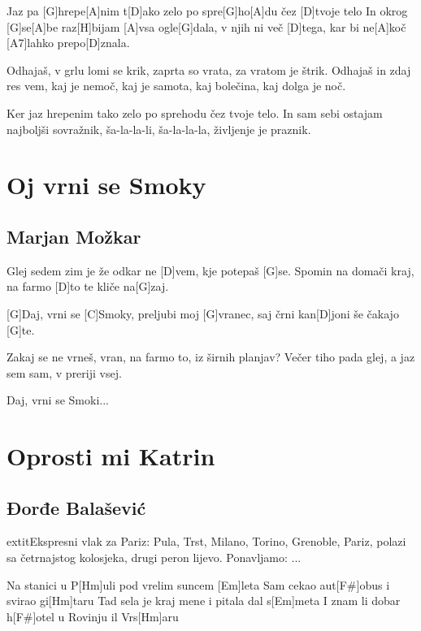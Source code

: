 \documentclass[a4paper,12pt]{article}
\begin{document}
\begin{multicols}{2}
\begin{guitar}
Jaz pa [G]hrepe[A]nim t[D]ako zelo
po spre[G]ho[A]du čez [D]tvoje telo
In okrog [G]se[A]be raz[H]bijam [A]vsa ogle[G]dala,
v njih ni več [D]tega, kar bi ne[A]koč [A7]lahko prepo[D]znala.


Odhajaš, v grlu lomi se krik,
zaprta so vrata, za vratom je štrik.
Odhajaš in zdaj res vem, kaj je nemoč,
kaj je samota, kaj bolečina,
kaj dolga je noč.


Ker jaz hrepenim tako zelo
po sprehodu čez tvoje telo.
In sam sebi ostajam najboljši sovražnik,
ša-la-la-li, ša-la-la-la, življenje je praznik.

\end{guitar}
\section{Oj vrni se Smoky}
\subsection*{Marjan Možkar}
\begin{guitar}
[G]Glej sedem zim je že
odkar ne [D]vem,
kje potepaš [G]se.
Spomin na domači kraj,
na farmo [D]to te kliče na[G]zaj.



[G]Daj, vrni se [C]Smoky,
preljubi moj [G]vranec,
saj črni kan[D]joni še čakajo [G]te.



Zakaj se ne vrneš, vran,
na farmo to,
iz širnih planjav?
Večer tiho pada glej,
a jaz sem sam,
v preriji vsej.



Daj, vrni se Smoki...

\end{guitar}
\section{Oprosti mi Katrin}
\subsection*{Đorđe Balašević}
\begin{guitar}
	extit{Ekspresni vlak za Pariz: Pula, Trst, Milano,
Torino, Grenoble, Pariz, polazi sa četrnajstog
kolosjeka, drugi peron lijevo. 
Ponavljamo: ...}


Na stanici u P[Hm]uli pod vrelim suncem [Em]leta
Sam cekao aut[F#]obus i svirao gi[Hm]taru
Tad sela je kraj mene i pitala dal s[Em]meta
I znam li dobar h[F#]otel u Rovinju il Vrs[Hm]aru



\end{guitar}
\end{multicols}
\end{document}

